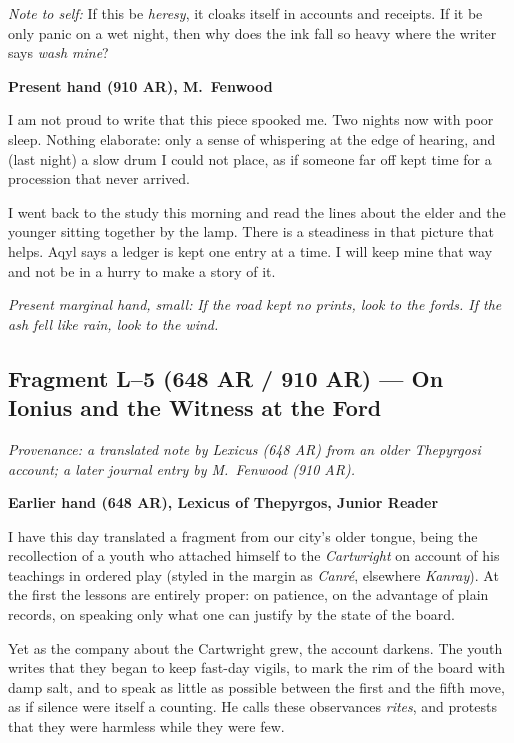 \documentclass[11pt]{article}
\begin{document}
\medskip
\noindent\textit{Note to self:} If this be \emph{heresy}, it cloaks itself in accounts and receipts. If it be only panic on a wet night, then why does the ink fall so heavy where the writer says \emph{wash mine}?

\medskip
\noindent\textbf{Present hand (910 AR), M.\ Fenwood}

I am not proud to write that this piece spooked me. Two nights now with poor sleep. Nothing elaborate: only a sense of whispering at the edge of hearing, and (last night) a slow drum I could not place, as if someone far off kept time for a procession that never arrived.

I went back to the study this morning and read the lines about the elder and the younger sitting together by the lamp. There is a steadiness in that picture that helps. Aqyl says a ledger is kept one entry at a time. I will keep mine that way and not be in a hurry to make a story of it.

\medskip
\noindent\textit{Present marginal hand, small:} \emph{If the road kept no prints, look to the fords. If the ash fell like rain, look to the wind.}

\subsection{Fragment L--5 (648 AR / 910 AR) --- On Ionius and the Witness at the Ford}
\label{frag:l5}
{}

\noindent\textit{Provenance: a translated note by Lexicus (648 AR) from an older Thepyrgosi account; a later journal entry by M.\ Fenwood (910 AR).}

\medskip
\noindent\textbf{Earlier hand (648 AR), Lexicus of Thepyrgos, Junior Reader}

I have this day translated a fragment from our city’s older tongue, being the recollection of a youth who attached himself to the \textit{Cartwright} on account of his teachings in ordered play (styled in the margin as \textit{Canr\'e}, elsewhere \textit{Kanray}). At the first the lessons are entirely proper: on patience, on the advantage of plain records, on speaking only what one can justify by the state of the board. 

Yet as the company about the Cartwright grew, the account darkens. The youth writes that they began to keep fast-day vigils, to mark the rim of the board with damp salt, and to speak as little as possible between the first and the fifth move, as if silence were itself a counting. He calls these observances \textit{rites}, and protests that they were harmless while they were few.
\end{document}
